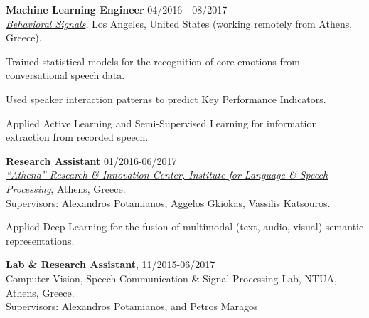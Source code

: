\documentclass[letterpaper]{article}
\renewenvironment{itemize}{
  \begin{list}{}{
    \setlength{\leftmargin}{1.5em}
  }
}{
  \end{list}
}
\begin{document}
\begin{itemize}
\item 
    \textbf{Machine Learning Engineer} \hfill 04/2016 - 08/2017\\ 
    \href{https://behavioralsignals.com/}{\it Behavioral Signals}, Los Angeles, United States (working remotely from Athens, Greece).
    \begin{itemize}
        \item Trained statistical models for the recognition of core emotions from conversational speech data.
        \item Used speaker interaction patterns to predict Key Performance Indicators.
        \item Applied Active Learning and Semi-Supervised Learning for information extraction from recorded speech. %
    \end{itemize}  


    
    

\item 
    \textbf{Research Assistant} \hfill 01/2016-06/2017\\
    \href{http://www.ilsp.gr/en}{\it ``Athena'' Research \& Innovation Center, Institute for Language \& Speech Processing}, Athens, Greece.\\
    Supervisors: Alexandros Potamianos, Aggelos Gkiokas, Vassilis Katsouros.


    \begin{itemize}
    \item Applied Deep Learning for the fusion of multimodal (text, audio, visual) semantic representations. 
    \end{itemize}
\iffalse
\item 
    \textbf{Lab \& Research Assistant}, 11/2015-06/2017\\
    Computer Vision, Speech Communication \& Signal Processing Lab, NTUA, Athens, Greece.\\
    Supervisors: Alexandros Potamianos, and Petros Maragos


\end{itemize}
\end{document}
